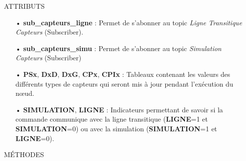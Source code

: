 \documentclass[a4paper,french, titlepage]{book}
\begin{document}
\begin{center}
ATTRIBUTS
\end{center}

\begin{itemize}
\item[•] \textbf{sub\_capteurs\_ligne} : Permet de s'abonner au topic \emph{Ligne Transitique Capteurs} (Subscriber).
\item[•] \textbf{sub\_capteurs\_simu} : Permet de s'abonner au topic \emph{Simulation Capteurs} (Subscriber)
\item[•] \textbf{PSx}, \textbf{DxD}, \textbf{DxG}, \textbf{CPx}, \textbf{CPIx} : Tableaux contenant les valeurs des différents types de capteurs qui seront mis à jour pendant l'exécution du nœud.
\item[•] \textbf{SIMULATION}, \textbf{LIGNE} : Indicateurs permettant de savoir si la commande communique avec la ligne transitique (\textbf{LIGNE}=1 et \textbf{SIMULATION}=0) ou avec la simulation (\textbf{SIMULATION}=1 et \textbf{LIGNE}=0).
\end{itemize}

\newpage

\begin{center}
MÉTHODES
\end{center}
\end{document}
